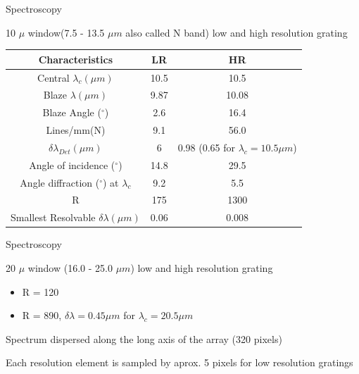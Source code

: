 \documentclass{beamer}
\begin{document}
\begin{frame}{Spectroscopy}

10 $\mu $ window(7.5 - 13.5 $\mu m$ also called N band) low and high resolution grating
\begin{tabular}{|c|c|c|}
\hline
Characteristics & 	LR	& HR \\
\hline
Central $\lambda_c(\mu m)$	& 10.5	& 10.5 \\
\hline
Blaze $\lambda (\mu m)$ &	9.87	& 10.08 \\
\hline
Blaze Angle ($^{\circ}$) & 	2.6	& 16.4 \\
\hline
Lines/mm(N)	& 9.1 &	56.0 \\
\hline
$\delta \lambda_{Det} (\mu m)$ &	6	& 0.98 (0.65 for $\lambda_c = 10.5 \mu m$)\\
\hline
Angle of incidence ($^{\circ}$)	& 14.8 &	29.5\\
\hline
Angle diffraction ($^{\circ}$) at $\lambda_c$	& 9.2	& 5.5\\
\hline
R	& 175	& 1300\\
\hline
Smallest Resolvable $ \delta \lambda (\mu m)$ &	0.06	&0.008 \\
\hline
\end{tabular}
\end{frame}
\begin{frame}{Spectroscopy}

20 $\mu $ window (16.0 - 25.0 $\mu m$)  low and high resolution grating

\begin{itemize}
\item R = 120
\item R = 890, $\delta \lambda = 0.45 \mu m$ for $\lambda_c = 20.5 \mu m$ 
\end{itemize}


Spectrum dispersed along the long axis of the array (320 pixels)

Each resolution element is sampled by aprox. 5 pixels for low resolution gratings

\end{frame}
\end{document}
